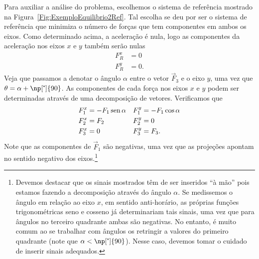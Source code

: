 Para auxiliar a análise do problema, escolhemos o sistema de referência mostrado na Figura~\ref{Fig:ExemploEquilibrio2Ref}. Tal escolha se deu por ser o sistema de referência que minimiza o número de forças que tem componentes em ambos os eixos. Como determinado acima, a aceleração é nula, logo as componentes da aceleração nos eixos $x$ e $y$ também serão nulas
\begin{align}
    F_R^x &= 0 \\
    F_R^y &= 0.
\end{align}
%
Veja que passamos a denotar o ângulo $\alpha$ entre o vetor $\vec{F}_3$ e o eixo $y$, uma vez que $\theta = \alpha + \np[\tcdegree]{90}$. As componentes de cada força nos eixos $x$ e $y$ podem ser determinadas através de uma decomposição de vetores. Verificamos que
\begin{align*}
    F_1^x &= -F_1\operatorname{sen}\alpha & F_1^y &= -F_1 \cos\alpha \\
    F_2^x &= F_2 & F_2^y &= 0 \\
    F_3^x &= 0 & F_3^y &= F_3.
\end{align*}
%
Note que as componentes de $\vec{F}_1$ são negativas, uma vez que as projeções apontam no sentido negativo dos eixos.\footnote{Devemos destacar que os sinais mostrados têm de ser inseridos ``à mão'' pois estamos fazendo a decomposição através do ângulo $\alpha$. Se medissemos o ângulo em relação ao eixo $x$, em sentido anti-horário, as próprias funções trigonométricas seno e cosseno já determinariam tais sinais, uma vez que para ângulos no terceiro quadrante ambas são negativas. No entanto, é muito comum ao se trabalhar com ângulos os retringir a valores do primeiro quadrante (note que $\alpha < \np[\tcdegree]{90}$). Nesse caso, devemos tomar o cuidado de inserir sinais adequados.}

